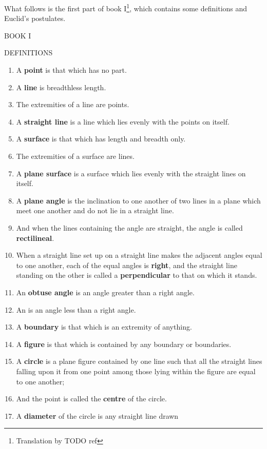 What follows is the first part of book I\footnote{Translation by TODO ref}, which contains some definitions and Euclid's postulates.

\begin{displayquote}
{\LARGE \centering BOOK I \par}
{\centering DEFINITIONS\par}
\begin{enumerate}
\item A \textbf{point} is that which has no part.
\item A \textbf{line} is breadthless length.
\item The extremities of a line are points.
\item A \textbf{straight line} is a line which lies evenly with the
points on itself.
\item A \textbf{surface} is that which has length and breadth only.
\item The extremities of a surface are lines.
\item A \textbf{plane surface} is a surface which lies evenly with
the straight lines on itself.
\item A \textbf{plane angle} is the inclination to one another of
two lines in a plane which meet one another and do not lie in
a straight line.
\item And when the lines containing the angle are straight,
the angle is called \textbf{rectilineal}.
\item When a straight line set up on a straight line makes
the adjacent angles equal to one another, each of the equal
angles is \textbf{right}, and the straight line standing on the other is
called a \textbf{perpendicular} to that on which it stands.
\item An \textbf{obtuse angle} is an angle greater than a right
angle.
\item An  is an angle less than a right angle.
\item A \textbf{boundary} is that which is an extremity of anything.
\item A \textbf{figure} is that which is contained by any boundary
or boundaries.
\item A \textbf{circle} is a plane figure contained by one line such
that all the straight lines falling upon it from one point among
those lying within the figure are equal to one another;
\item And the point is called the \textbf{centre} of the circle.
\item A \textbf{diameter} of the circle is any straight line drawn

\end{enumerate}
\end{displayquote}
